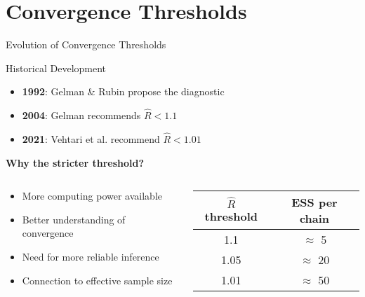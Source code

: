 \documentclass[aspectratio=169]{beamer}
\begin{document}
\section{Convergence Thresholds}

\begin{frame}{Evolution of Convergence Thresholds}
    \begin{block}{Historical Development}
        \begin{itemize}
            \item \textbf{1992}: Gelman \& Rubin propose the diagnostic
            \item \textbf{2004}: Gelman recommends $\hat{R} < 1.1$
            \item \textbf{2021}: Vehtari et al. recommend $\hat{R} < 1.01$
        \end{itemize}
    \end{block}
    
    \vspace{0.5cm}
    \textbf{Why the stricter threshold?}
    
    \begin{columns}
        \begin{column}{0.5\textwidth}
            \begin{itemize}
                \item More computing power available
                \item Better understanding of convergence
                \item Need for more reliable inference
                \item Connection to effective sample size
            \end{itemize}
        \end{column}
        \begin{column}{0.5\textwidth}
            \begin{center}
                \begin{tabular}{|c|c|}
                    \hline
                    $\hat{R}$ threshold & ESS per chain \\
                    \hline
                    1.1 & $\approx$ 5 \\
                    1.05 & $\approx$ 20 \\
                    1.01 & $\approx$ 50 \\
                    \hline
                \end{tabular}
            \end{center}
        \end{column}
    \end{columns}
\end{frame}
\end{document}
